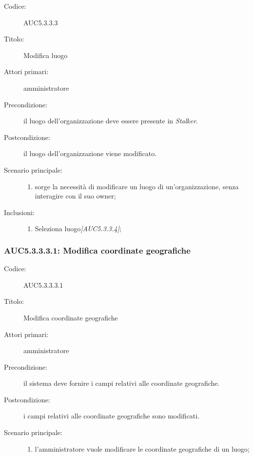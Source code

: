 \documentclass[../../../analisi-dei-requisiti.tex]{subfiles}
\begin{document}
\begin{description}
  \item[Codice:] AUC5.3.3.3
  \item[Titolo:] Modifica luogo
  \item[Attori primari:] amministratore
  \item[Precondizione:] il luogo dell'organizzazione deve essere presente in \emph{Stalker}.
  \item[Postcondizione:] il luogo dell'organizzazione viene modificato.
  \item[Scenario principale:]
  \begin{enumerate}
    \item sorge la necessità di modificare un luogo di un'organizzazione, senza interagire con il suo owner;
  \end{enumerate}
  \item[Inclusioni:]
  \begin{enumerate}
    \item Seleziona luogo\emph{[AUC5.3.3.4]};
  \end{enumerate}
\end{description}

\subsubsection{AUC5.3.3.3.1: Modifica coordinate geografiche}%
\label{subs:AUC5.3.3.3.1}
\begin{description}
  \item[Codice:] AUC5.3.3.3.1
  \item[Titolo:] Modifica coordinate geografiche
  \item[Attori primari:] amministratore
  \item[Precondizione:] il sistema deve fornire i campi relativi alle coordinate geografiche.
  \item[Postcondizione:] i campi relativi alle coordinate geografiche sono modificati.
  \item[Scenario principale:]
  \begin{enumerate}
    \item l'amministratore vuole modificare le coordinate geografiche di un luogo;
  \end{enumerate}
\end{description}
\end{document}

